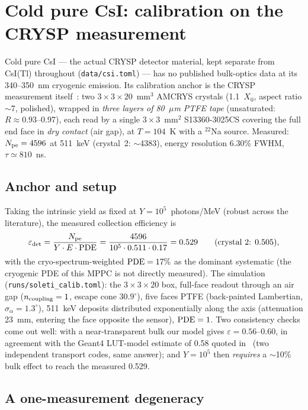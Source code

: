 \documentclass[11pt,a4paper]{article}
\newcommand{\csitl}{CsI(Tl)}
\newcommand{\sa}{\sigma_\alpha}
\begin{document}
\section{Cold pure CsI: calibration on the CRYSP measurement}
\label{sec:coldcsi}

Cold pure CsI --- the actual CRYSP detector material, kept separate from \csitl{}
throughout (\texttt{data/csi.toml}) --- has no published bulk-optics data at its
340--350~nm cryogenic emission. Its calibration anchor is the CRYSP measurement
itself~\cite{soleti2024}: two $3\times3\times20$~mm$^3$ AMCRYS crystals (1.1~$X_0$,
aspect ratio $\sim$7, polished), wrapped in \emph{three layers of 80~$\mu$m PTFE tape}
(unsaturated: $R \approx 0.93$--0.97), each read by a single $3\times3$~mm$^2$
S13360-3025CS covering the full end face in \emph{dry contact} (air gap), at $T=104$~K
with a $^{22}$Na source. Measured: $N_{\rm pe} = 4596$ at 511~keV (crystal~2:
$\sim$4383), energy resolution 6.30\% FWHM, $\tau \simeq 810$~ns.

\subsection{Anchor and setup}

Taking the intrinsic yield as fixed at $Y = 10^5$~photons/MeV (robust across the
literature), the measured collection efficiency is
\begin{equation}
  \varepsilon_{\rm det} = \frac{N_{\rm pe}}{Y \cdot E \cdot {\rm PDE}}
  = \frac{4596}{10^5 \cdot 0.511 \cdot 0.17} = 0.529
  \qquad (\text{crystal 2: } 0.505),
\end{equation}
with the cryo-spectrum-weighted ${\rm PDE} = 17\%$ as the dominant systematic (the
cryogenic PDE of this MPPC is not directly measured). The simulation
(\texttt{runs/soleti\_calib.toml}): the $3\times3\times20$ box, full-face readout through
an air gap ($n_{\rm coupling}=1$, escape cone $30.9^\circ$), five faces PTFE
(back-painted Lambertian, $\sa = 1.3^\circ$), 511~keV deposits distributed exponentially
along the axis (attenuation 23~mm, entering the face opposite the sensor), ${\rm PDE}=1$.
Two consistency checks come out well: with a near-transparent bulk our model gives
$\varepsilon = 0.56$--0.60, in agreement with the Geant4 LUT-model estimate of 0.58
quoted in~\cite{soleti2024} (two independent transport codes, same answer); and
$Y = 10^5$ then \emph{requires} a $\sim$10\% bulk effect to reach the measured 0.529.

\subsection{A one-measurement degeneracy}
\end{document}

